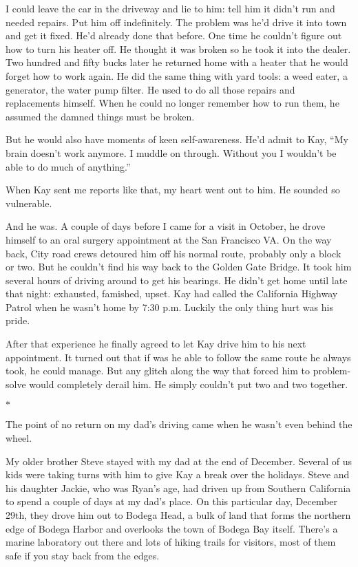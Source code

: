 \documentclass[12pt]{book}
\begin{document}
I could leave the car in the driveway and lie to him: tell him it didn't run and needed repairs. Put him off indefinitely. The problem was he'd drive it into town and get it fixed. He'd already done that before. One time he couldn't figure out how to turn his heater off. He thought it was broken so he took it into the dealer. Two hundred and fifty bucks later he returned home with a heater that he would forget how to work again. He did the same thing with yard tools: a weed eater, a generator, the water pump filter. He used to do all those repairs and replacements himself. When he could no longer remember how to run them, he assumed the damned things must be broken.

But he would also have moments of keen self-awareness. He'd admit to Kay, ``My brain doesn't work anymore. I muddle on through. Without you I wouldn't be able to do much of anything.''

When Kay sent me reports like that, my heart went out to him. He sounded so vulnerable.

And he was. A couple of days before I came for a visit in October, he drove himself to an oral surgery appointment at the San Francisco VA. On the way back, City road crews detoured him off his normal route, probably only a block or two. But he couldn't find his way back to the Golden Gate Bridge. It took him several hours of driving around to get his bearings. He didn't get home until late that night: exhausted, famished, upset. Kay had called the California Highway Patrol when he wasn't home by 7:30 p.m. Luckily the only thing hurt was his pride.

After that experience he finally agreed to let Kay drive him to his next appointment. It turned out that if was he able to follow the same route he always took, he could manage. But any glitch along the way that forced him to problem-solve would completely derail him. He simply couldn't put two and two together.

\begin{center}$*$\end{center}

The point of no return on my dad's driving came when he wasn't even behind the wheel.

My older brother Steve stayed with my dad at the end of December. Several of us kids were taking turns with him to give Kay a break over the holidays. Steve and his daughter Jackie, who was Ryan's age, had driven up from Southern California to spend a couple of days at my dad's place. On this particular day, December 29th, they drove him out to Bodega Head, a bulk of land that forms the northern edge of Bodega Harbor and overlooks the town of Bodega Bay itself. There's a marine laboratory out there and lots of hiking trails for visitors, most of them safe if you stay back from the edges.
\end{document}
